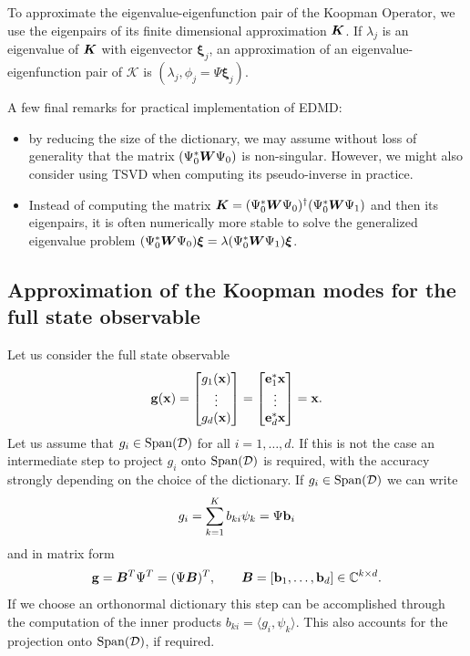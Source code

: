 To approximate the eigenvalue-eigenfunction pair of the Koopman Operator, we use the eigenpairs of its finite dimensional approximation $\vb*{K}$. If $\lambda_j$ is an eigenvalue of $\vb*{K}$ with eigenvector $\bm{\xi}_j$, an approximation of an eigenvalue-eigenfunction pair of $\mathcal{K}$ is $(\lambda_j, \phi_j = \Psi\bm{\xi}_j)$.

A few final remarks for practical implementation of EDMD:
\begin{itemize}
    \item by reducing the size of the dictionary, we may assume without loss of generality that the matrix $(\Psi_0^*\vb*{W}\Psi_0)$ is non-singular. However, we might also consider using TSVD when computing its pseudo-inverse in practice.  
    \item Instead of computing the matrix $\vb*{K} = (\Psi_0^*\vb*{W}\Psi_0)^{\dagger}(\Psi_0^*\vb*{W}\Psi_1)$ and then its eigenpairs, it is often numerically more stable to solve the generalized eigenvalue problem $(\Psi_0^*\vb*{W}\Psi_0)\bm{\xi} = \lambda(\Psi_0^*\vb*{W}\Psi_1)\bm{\xi}$.
\end{itemize}

\subsection{Approximation of the Koopman modes for the full state observable}
Let us consider the full state observable
\begin{equation}
    \label{full_state_def}
    \vb{g}(\vb{x}) = 
    \begin{bmatrix}
    g_1(\vb{x}) \\
    \vdots \\
    g_d(\vb{x})
    \end{bmatrix} = 
    \begin{bmatrix}
    \vb{e}_1^*\vb{x} \\
    \vdots \\
    \vb{e}_d^*\vb{x}
    \end{bmatrix} = \vb{x}.
\end{equation}
Let us assume that $g_i\in\mathrm{Span}(\mathcal{D})$ for all $i = 1,\dots,d$. If this is not the case an intermediate step to project $g_i$ onto $\mathrm{Span}(\mathcal{D})$ is required, with the accuracy strongly depending on the choice of the dictionary. If $g_i\in\mathrm{Span}(\mathcal{D})$ we can write
\begin{equation}
    g_i = \sum_{k=1}^K b_{ki}\psi_k = \Psi\vb{b}_i
\end{equation}
and in matrix form
\begin{equation*}
    \vb{g} = \vb*{B}^T\Psi^T = (\Psi\vb*{B})^T, \qquad \vb*{B} = \left[\vb{b}_1, \dots,\vb{b}_d\right]\in\mathbb{C}^{k\times d}.
\end{equation*}
If we choose an orthonormal dictionary this step can be accomplished through the computation of the inner products $b_{ki} = \langle g_i, \psi_k \rangle$. This also accounts for the projection onto $\mathrm{Span}(\mathcal{D})$, if required.


